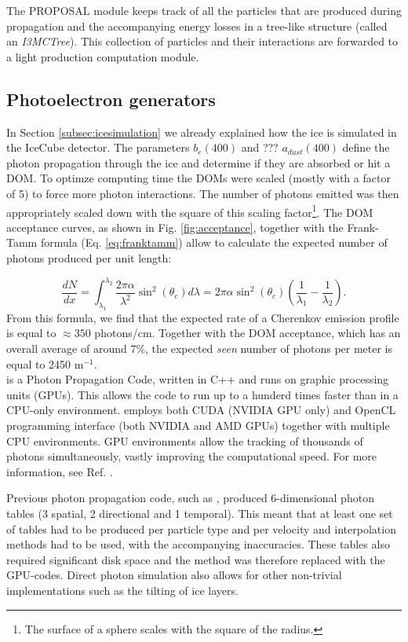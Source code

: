 \noindent The PROPOSAL module keeps track of all the particles that are produced during propagation and the accompanying energy losses in a tree-like structure (called an \textit{I3MCTree}). This collection of particles and their interactions are forwarded to a light production computation module.

\subsection{Photoelectron generators}
In Section \ref{subsec:icesimulation} we already explained how the ice is simulated in the IceCube detector. The parameters $b_e(400)$ and ??? $a_{dust}(400)$ define the photon propagation through the ice and determine if they are absorbed or hit a DOM. To optimze computing time the DOMs were scaled (mostly with a factor of 5) to force more photon interactions. The number of photons emitted was then appropriately scaled down with the square of this scaling factor\footnote{The surface of a sphere scales with the square of the radius.}. The DOM acceptance curves, as shown in Fig. \ref{fig:acceptance}, together with the Frank-Tamm formula (Eq. \ref{eq:franktamm}) allow to calculate the expected number of photons produced per unit length:

\begin{equation}
\frac{dN}{dx} = \int_{\lambda_1}^{\lambda_2} \frac{2 \pi \alpha}{\lambda^2} \sin^2 \left(\theta_c\right) d\lambda = 2\pi \alpha \sin^2 \left(\theta_c\right) \left(\frac{1}{\lambda_1} -\frac{1}{\lambda_2}\right).
\end{equation}
From this formula, we find that the expected rate of a Cherenkov emission profile is equal to $\approx 350$ photons/cm. Together with the DOM acceptance, which has an overall average of around 7\%, the expected \textit{seen} number of photons per meter is equal to 2450 m$^{-1}$.\\

\noindent {} is a Photon Propagation Code, written in C++ and runs on graphic processing units (GPUs). This allows the code to run up to a hunderd times faster than in a CPU-only environment.  employs both CUDA (NVIDIA GPU only) and OpenCL programming interface (both NVIDIA and AMD GPUs) together with multiple CPU environments.
GPU environments allow the tracking of thousands of photons simultaneously, vastly improving the computational speed. For more information, see Ref. \cite{dimaspice}.

Previous photon propagation code, such as  \cite{Lundberg:2007mf}, produced 6-dimensional photon tables (3 spatial, 2 directional and 1 temporal). This meant that at least one set of tables had to be produced per particle type and per velocity and interpolation methods had to be used, with the accompanying inaccuracies. These tables also required significant disk space and the method was therefore replaced with the GPU-codes. Direct photon simulation also allows for other non-trivial implementations such as the tilting of ice layers.\\

